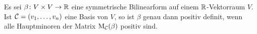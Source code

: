 

\begin{definition}
  Es sei $\beta \colon V \times V \to \mathbb{R}$ eine symmetrische Bilinearform auf einem $\mathbb{R}$-Vektorraum $V$.
  Ist $\mathcal{C} = (v_1, \dotsc, v_n)$ eine Basis von $V$, so ist $\beta$ genau dann positiv definit, wenn alle Hauptminoren der Matrix $\mathrm{M}_{\mathcal{C}}(\beta)$ positiv sind.
\end{definition}

















































